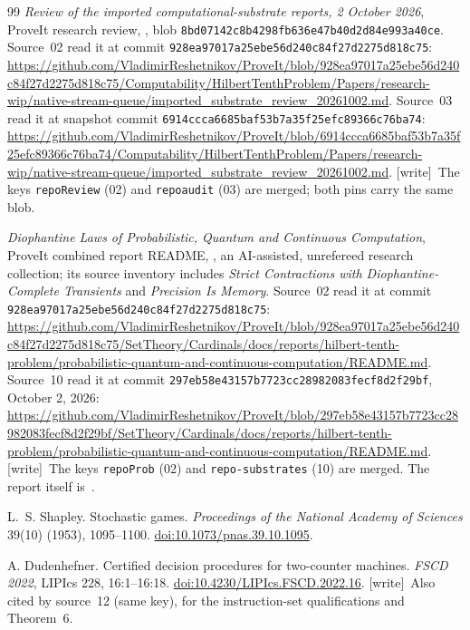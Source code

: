 \documentclass[11pt,letterpaper]{article}
\theoremstyle{definition}
\theoremstyle{remark}
\newcommand{\repo}{\texttt{928ea97017a25ebe56d240c84f27d2275d818c75}}
\newcommand{\wtag}{\textup{[write]}}
\begin{document}
\begin{thebibliography}{99}
\emph{Review of the imported computational-substrate reports, 2 October 2026},
ProveIt research review,
, blob \texttt{8bd07142c8b4298fb636e47b40d2d84e993a40ce}.
Source~02 read it at commit \repo:
\url{https://github.com/VladimirReshetnikov/ProveIt/blob/928ea97017a25ebe56d240c84f27d2275d818c75/Computability/HilbertTenthProblem/Papers/research-wip/native-stream-queue/imported_substrate_review_20261002.md}.
Source~03 read it at snapshot commit \texttt{6914ccca6685baf53b7a35f25efc89366c76ba74}:
\url{https://github.com/VladimirReshetnikov/ProveIt/blob/6914ccca6685baf53b7a35f25efc89366c76ba74/Computability/HilbertTenthProblem/Papers/research-wip/native-stream-queue/imported_substrate_review_20261002.md}.
\wtag\ The keys \texttt{repoReview} (02) and \texttt{repoaudit} (03) are merged; both pins carry the same blob.

\emph{Diophantine Laws of Probabilistic, Quantum and Continuous Computation},
ProveIt combined report README,
, an AI-assisted, unrefereed research collection; its source inventory includes \emph{Strict Contractions with Diophantine-Complete Transients} and \emph{Precision Is Memory}.
Source~02 read it at commit \repo:
\url{https://github.com/VladimirReshetnikov/ProveIt/blob/928ea97017a25ebe56d240c84f27d2275d818c75/SetTheory/Cardinals/docs/reports/hilbert-tenth-problem/probabilistic-quantum-and-continuous-computation/README.md}.
Source~10 read it at commit \texttt{297eb58e43157b7723cc28982083fecf8d2f29bf}, October 2, 2026:
\url{https://github.com/VladimirReshetnikov/ProveIt/blob/297eb58e43157b7723cc28982083fecf8d2f29bf/SetTheory/Cardinals/docs/reports/hilbert-tenth-problem/probabilistic-quantum-and-continuous-computation/README.md}.
\wtag\ The keys \texttt{repoProb} (02) and \texttt{repo-substrates} (10) are merged. The report itself is~\cite{pqc}.

L.~S. Shapley.
Stochastic games.
\emph{Proceedings of the National Academy of Sciences} 39(10) (1953),
1095--1100.
\href{https://doi.org/10.1073/pnas.39.10.1095}{doi:10.1073/pnas.39.10.1095}.

A. Dudenhefner.
Certified decision procedures for two-counter machines.
\emph{FSCD 2022}, LIPIcs 228, 16:1--16:18.
\href{https://doi.org/10.4230/LIPIcs.FSCD.2022.16}{doi:10.4230/LIPIcs.FSCD.2022.16}.
\wtag\ Also cited by source~12 (same key), for the instruction-set qualifications and Theorem~6.


\end{thebibliography}
\end{document}
